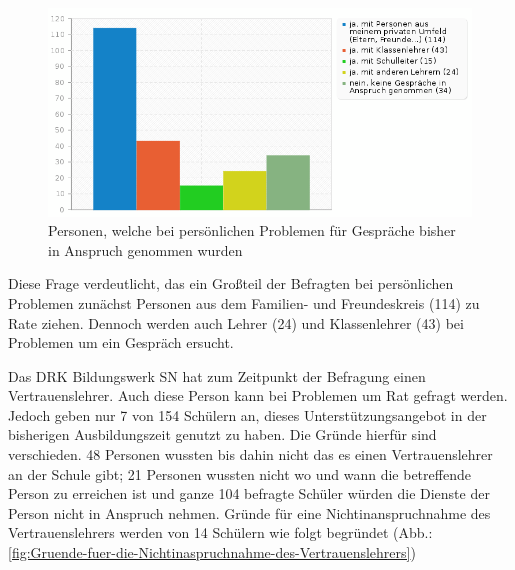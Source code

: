 \begin{figure}[h]
	\centering
		\includegraphics[width=1.0\textwidth]{images/welche-Personen-wurden-bisher-bei-persoenlichen-Problemen-in-der-zurueckliegenden-Ausbildungszeit-fuer-Gespraeche-in-Anspruch-genommen.png}
	\caption{Personen, welche bei persönlichen Problemen für Gespräche bisher in Anspruch genommen wurden}
	\label{fig:welche-Personen-wurden-bisher bei-persoenlichen-Problemen-in-der-zurueckliegenden-Ausbildungszeit-fuer-Gespraeche-in-Anspruch-genommen}
\end{figure}

\noindent
Diese Frage verdeutlicht, das ein Großteil der Befragten bei persönlichen Problemen zunächst Personen aus dem Familien- und Freundeskreis (114) zu Rate ziehen. Dennoch werden auch Lehrer (24) und Klassenlehrer (43) bei Problemen um ein Gespräch ersucht.

Das DRK Bildungswerk SN hat zum Zeitpunkt der Befragung einen Vertrauenslehrer. Auch diese Person kann bei Problemen um Rat gefragt werden. Jedoch geben nur 7 von 154 Schülern an, dieses Unterstützungsangebot in der bisherigen Ausbildungszeit genutzt zu haben. Die Gründe hierfür sind verschieden. 48 Personen wussten bis dahin nicht das es einen Vertrauenslehrer an der Schule gibt; 21 Personen wussten nicht wo und wann die betreffende Person zu erreichen ist und ganze 104 befragte Schüler würden die Dienste der Person nicht in Anspruch nehmen. Gründe für eine Nichtinanspruchnahme des Vertrauenslehrers werden von 14 Schülern wie folgt begründet (Abb.: \ref{fig:Gruende-fuer-die-Nichtinaspruchnahme-des-Vertrauenslehrers})

